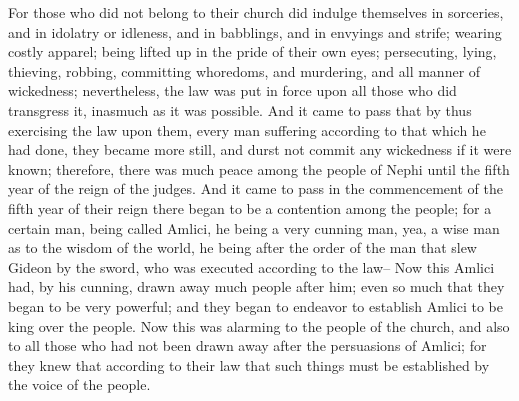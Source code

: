 For those who did not belong to their church did indulge themselves in sorceries, and in idolatry or idleness, and in babblings, and in envyings and strife; wearing costly apparel; being lifted up in the pride of their own eyes; persecuting, lying, thieving, robbing, committing whoredoms, and murdering, and all manner of wickedness; nevertheless, the law was put in force upon all those who did transgress it, inasmuch as it was possible.
\bverse \iffalse And it came to pass that by thus exercising the law upon them, every man suffering according to that which he had done, they became more still, and durst not commit any wickedness if it were known; therefore, there was much peace among the people of Nephi until the fifth year of the reign of the judges. \fi
And it came to pass that by thus exercising the law upon them, every man suffering according to that which he had done, they became more still, and durst not commit any wickedness if it were known; therefore, there was much peace among the people of Nephi until the fifth year of the reign of the judges.
\bchapter
\bverse \iffalse And it came to pass in the commencement of the fifth year of their reign there began to be a contention among the people; for a certain man, being called Amlici, he being a very cunning man, yea, a wise man as to the wisdom of the world, he being after the order of the man that slew Gideon by the sword, who was executed according to the law-- \fi
And it came to pass in the commencement of the fifth year of their reign there began to be a contention among the people; for a certain man, being called Amlici, he being a very cunning man, yea, a wise man as to the wisdom of the world, he being after the order of the man that slew Gideon by the sword, who was executed according to the law--
\bverse \iffalse Now this Amlici had, by his cunning, drawn away much people after him; even so much that they began to be very powerful; and they began to endeavor to establish Amlici to be king over the people. \fi
Now this Amlici had, by his cunning, drawn away much people after him; even so much that they began to be very powerful; and they began to endeavor to establish Amlici to be king over the people.
\bverse \iffalse Now this was alarming to the people of the church, and also to all those who had not been drawn away after the persuasions of Amlici; for they knew that according to their law that such things must be established by the voice of the people. \fi
Now this was alarming to the people of the church, and also to all those who had not been drawn away after the persuasions of Amlici; for they knew that according to their law that such things must be established by the voice of the people.
